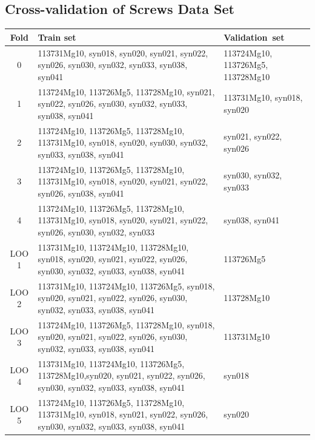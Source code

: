 \subsection{Cross-validation of Screws Data Set}\label{subsec:cross-validation-screws}
\begin{table}[!htb]
    \centering
    \makegapedcells
    \begin{tabular}{|c|p{}|p{}|}
        \hline
        \textbf{Fold} & \textbf{Train set} &\textbf{Validation~set} \\
        \hline
        0 & 113731Mg10, syn018, syn020, syn021, syn022, syn026, syn030, syn032, syn033, syn038, syn041 & 113724Mg10, 113726Mg5, 113728Mg10 \\
        \hline
        1 & 113724Mg10, 113726Mg5, 113728Mg10, syn021, syn022, syn026, syn030, syn032, syn033, syn038, syn041 & 113731Mg10, syn018, syn020 \\
        \hline
        2 & 113724Mg10, 113726Mg5, 113728Mg10, 113731Mg10, syn018, syn020, syn030, syn032, syn033, syn038, syn041 & syn021, syn022, syn026 \\
        \hline
        3 & 113724Mg10, 113726Mg5, 113728Mg10, 113731Mg10, syn018, syn020, syn021, syn022, syn026, syn038, syn041 & syn030, syn032, syn033 \\
        \hline
        4 & 113724Mg10, 113726Mg5, 113728Mg10, 113731Mg10, syn018, syn020, syn021, syn022, syn026, syn030, syn032, syn033 & syn038, syn041 \\
        \hline
        \hline
        {\small LOO} 1 & 113731Mg10, 113724Mg10, 113728Mg10, syn018, syn020, syn021, syn022, syn026, syn030, syn032, syn033, syn038, syn041 & 113726Mg5 \\
        \hline
        {LOO} 2 &  113731Mg10, 113724Mg10, 113726Mg5, syn018, syn020, syn021, syn022, syn026, syn030, syn032, syn033, syn038, syn041& 113728Mg10\\
        \hline
        {LOO} 3 &  113724Mg10, 113726Mg5, 113728Mg10, syn018, syn020, syn021, syn022, syn026, syn030, syn032, syn033, syn038, syn041 &  113731Mg10\\
        \hline
        { LOO 4} & 113731Mg10, 113724Mg10, 113726Mg5, 113728Mg10,syn020, syn021, syn022, syn026, syn030, syn032, syn033, syn038, syn041 &  syn018\\
        \hline
        { LOO 5} &   113724Mg10, 113726Mg5, 113728Mg10, 113731Mg10, syn018, syn021, syn022, syn026, syn030, syn032, syn033, syn038, syn041 & syn020\\
        \hline

\end{tabular}
\end{table}
